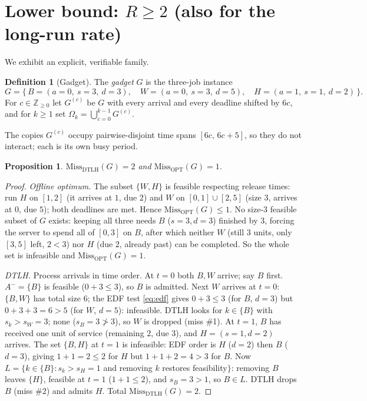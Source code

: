 \documentclass{amsart}
\newtheorem{proposition}[theorem]{Proposition}
\theoremstyle{definition}
\newtheorem{definition}[theorem]{Definition}
\begin{document}
\section{Lower bound: $R\ge 2$ (also for the long-run rate)}

We exhibit an explicit, verifiable family.

\begin{definition}[Gadget]\label{def:gadget}
The \emph{gadget} $G$ is the three-job instance
\[
G=\{\,B=(a{=}0,\ s{=}3,\ d{=}3),\quad
      W=(a{=}0,\ s{=}3,\ d{=}5),\quad
      H=(a{=}1,\ s{=}1,\ d{=}2)\,\}.
\]
For $c\in\mathbb{Z}_{\ge 0}$ let $G^{(c)}$ be $G$ with every arrival and every
deadline shifted by $6c$, and for $k\ge 1$ set
$\Omega_k=\bigcup_{c=0}^{k-1}G^{(c)}$.
\end{definition}

The copies $G^{(c)}$ occupy pairwise-disjoint time spans
$[6c,\,6c+5]$, so they do not interact; each is its own busy period.

\begin{proposition}\label{prop:gadget}
$\mathrm{Miss}_{\mathrm{DTLH}}(G)=2$ and $\mathrm{Miss}_{\mathrm{OPT}}(G)=1$.
\end{proposition}

\begin{proof}
\emph{Offline optimum.} The subset $\{W,H\}$ is feasible respecting release
times: run $H$ on $[1,2]$ (it arrives at $1$, due $2$) and $W$ on
$[0,1]\cup[2,5]$ (size $3$, arrives at $0$, due $5$); both deadlines are met.
Hence $\mathrm{Miss}_{\mathrm{OPT}}(G)\le 1$. No size-$3$ feasible subset of $G$
exists: keeping all three needs $B$ ($s=3,d=3$) finished by $3$, forcing the
server to spend all of $[0,3]$ on $B$, after which neither $W$ (still $3$ units,
only $[3,5]$ left, $2<3$) nor $H$ (due $2$, already past) can be completed. So
the whole set is infeasible and $\mathrm{Miss}_{\mathrm{OPT}}(G)=1$.

\emph{DTLH.} Process arrivals in time order.
At $t=0$ both $B,W$ arrive; say $B$ first. $A^-=\{B\}$ is feasible
($0+3\le 3$), so $B$ is admitted. Next $W$ arrives at $t=0$:
$\{B,W\}$ has total size $6$; the EDF test \eqref{eq:edf} gives
$0+3\le 3$ (for $B$, $d=3$) but $0+3+3=6>5$ (for $W$, $d=5$): infeasible.
DTLH looks for $k\in\{B\}$ with $s_k>s_W=3$; none ($s_B=3\not>3$), so $W$ is
dropped (miss \#1). At $t=1$, $B$ has received one unit of service (remaining
$2$, due $3$), and $H=(s{=}1,d{=}2)$ arrives. The set $\{B,H\}$ at $t=1$ is
infeasible: EDF order is $H$ ($d=2$) then $B$ ($d=3$), giving $1+1=2\le2$ for
$H$ but $1+1+2=4>3$ for $B$. Now $L=\{k\in\{B\}: s_k>s_H=1$ and removing $k$
restores feasibility$\}$: removing $B$ leaves $\{H\}$, feasible at $t=1$
($1+1\le 2$), and $s_B=3>1$, so $B\in L$. DTLH drops $B$ (miss \#2) and admits
$H$. Total $\mathrm{Miss}_{\mathrm{DTLH}}(G)=2$.
\end{proof}
\end{document}
